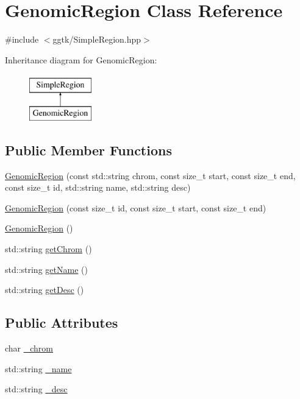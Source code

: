 \hypertarget{classGenomicRegion}{}\section{Genomic\+Region Class Reference}
\label{classGenomicRegion}


{\ttfamily \#include $<$ggtk/\+Simple\+Region.\+hpp$>$}

Inheritance diagram for Genomic\+Region\+:\begin{figure}[H]
\begin{center}
\leavevmode
\includegraphics[height=2.000000cm]{classGenomicRegion}
\end{center}
\end{figure}
\subsection*{Public Member Functions}
\begin{DoxyCompactItemize}
\item 
\hyperlink{classGenomicRegion_a48f916f38aad53815e187c28c211a615}{Genomic\+Region} (const std\+::string chrom, const size\+\_\+t start, const size\+\_\+t end, const size\+\_\+t id, std\+::string name, std\+::string desc)
\item 
\hyperlink{classGenomicRegion_a249cece2f76a9085d276ee5970ccfa59}{Genomic\+Region} (const size\+\_\+t id, const size\+\_\+t start, const size\+\_\+t end)
\item 
\hyperlink{classGenomicRegion_a8ff9fe5618b932a1caccbd9072ddaaef}{Genomic\+Region} ()
\item 
std\+::string \hyperlink{classGenomicRegion_af370137d0f3498d1611d85d63571af35}{get\+Chrom} ()
\item 
std\+::string \hyperlink{classGenomicRegion_a206d7c6c224c49b43166b4ad84f1a063}{get\+Name} ()
\item 
std\+::string \hyperlink{classGenomicRegion_a3ce8ecbe3eb5af63e37720aea716ee1f}{get\+Desc} ()
\end{DoxyCompactItemize}
\subsection*{Public Attributes}
\begin{DoxyCompactItemize}
\item 
char \hyperlink{classGenomicRegion_a05a207966ea9e12b3bb580edb0569ab3}{\+\_\+chrom}
\item 
std\+::string \hyperlink{classGenomicRegion_abb827ad33bd08fcf106229c60bc20106}{\+\_\+name}
\item 
std\+::string \hyperlink{classGenomicRegion_af4697f90d465c81be52e9a12f498ca34}{\+\_\+desc}
\end{DoxyCompactItemize}


